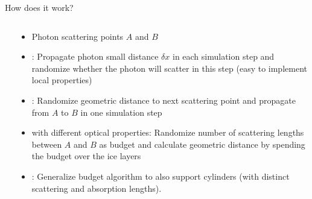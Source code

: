 
\begin{frame}[fragile]{How does it work?}

  \begin{columns}
    \begin{column}{0.5\textwidth}
      \begin{overlayarea}{\textwidth}{\textheight}
        \vspace*{2cm}
      \end{overlayarea}
    \end{column}
    \begin{column}{0.5\textwidth}

      \begin{itemize}
        \item Photon scattering points $A$ and $B$
        \item<1> : Propagate photon small distance $\delta x$ in each simulation step and randomize whether the photon will scatter in this step (easy to implement local properties)
        \item<2> : Randomize geometric distance to next scattering point and propagate from $A$ to $B$ in one simulation step
        \item<3>  with different optical properties: Randomize number of scattering lengths between $A$ and $B$ as budget and calculate geometric distance by spending the budget over the ice layers
        \item<4> : Generalize budget algorithm to also support cylinders (with distinct scattering and absorption lengths).
      \end{itemize}

    \end{column}
  \end{columns}

\end{frame}